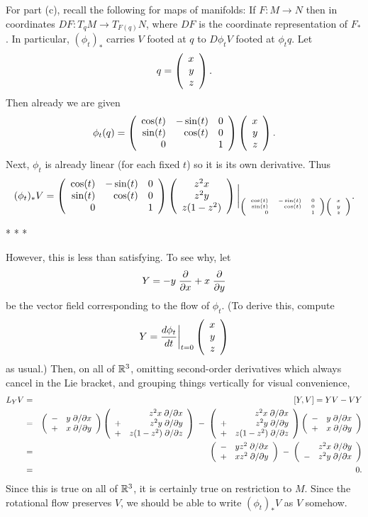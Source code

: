 \documentclass[10pt]{article}
\numberwithin{equation}{subsection}
\begin{document}
For part (c), recall the following for maps of manifolds:  If $F:M \to N$ then
in coordinates $DF:T_qM \to T_{F(q)}N$, where $DF$ is the coordinate
representation of $F_*$.  In particular, $(\phi_t)_*$ carries $V$ footed at $q$
to $D\phi_t V$ footed at $\phi_t q$.
Let
$$
	q=\left(\begin{array}{r} x \\ y \\ z\end{array}\right).
$$
Then already we are given
$$
	\phi_t(q) = \left(\begin{array}{rrrrrrrrrrrr} 
		\cos(t) & -\sin(t) & 0 \\
		\sin(t) &  \cos(t) & 0 \\
		0       &          & 1
	 \end{array}\right)
	\left(\begin{array}{r} x \\ y \\ z\end{array}\right).
$$
Next, $\phi_t$ is already linear (for each fixed $t$) so it is its own
derivative.  Thus
$$
	(\phi_t)_* V =
	\left(\begin{array}{rrrrrrrrrrrr} 
		\cos(t) & -\sin(t) & 0 \\
		\sin(t) &  \cos(t) & 0 \\
		0       &          & 1
	 \end{array}\right)
	\left(\begin{array}{c} z^2 x \\ z^2 y \\ z(1-z^2)
	\end{array}\right)
	\bigg|_{\tiny{
		 \left(\begin{array}{rrrrrrrrrrrr} 
			\cos(t) & -\sin(t) & 0 \\
			\sin(t) &  \cos(t) & 0 \\
			0       &          & 1
		 \end{array}\right) 
		\left(\begin{array}{r} x \\ y \\ z\end{array}\right)
	}}.
$$

\begin{center}* * *\end{center}

However, this is less than satisfying.  To see why, let
$$
	Y = -y\;\frac{\partial}{\partial x} + x\;\frac{\partial}{\partial y}
$$
be the vector field corresponding to the flow of $\phi_t$.
(To derive this, compute
$$
	Y = \frac{d\phi_t}{dt}\bigg|_{\tiny{t=0}}\left(\begin{array}{r} x \\ y \\ z\end{array}\right)
$$
as usual.)  Then, on all of $\mathbb{R}^3$, omitting second-order derivatives which
always cancel in the Lie bracket, and grouping things vertically for visual
convenience,
\begin{eqnarray*}
	L_Y V &=& [Y,V] = YV - VY \\
	&=&
		\left(\begin{array}{rrrrrrrrrrrr} 
			-&y \;\partial/\partial x \\
			+&x \;\partial/\partial y
		 \end{array}\right)
		\left(\begin{array}{rrrrrrrrrrrr} 
			& z^2 x    \;\partial/\partial x \\
			+&z^2 y    \;\partial/\partial y \\
			+&z(1-z^2) \;\partial/\partial z
		 \end{array}\right)
		\;-\;
		\left(\begin{array}{rrrrrrrrrrrr} 
			& z^2 x    \;\partial/\partial x \\
			+&z^2 y    \;\partial/\partial y \\
			+&z(1-z^2) \;\partial/\partial z
		 \end{array}\right)
		\left(\begin{array}{rrrrrrrrrrrr} 
			-&y \;\partial/\partial x \\
			+&x \;\partial/\partial y
		 \end{array}\right) \\
	&=&
		\left(\begin{array}{rrrrrrrrrrrr} 
			-&yz^2 \;\partial/\partial x \\
			+&xz^2 \;\partial/\partial y
		 \end{array}\right)
		\;-\;
		\left(\begin{array}{rrrrrrrrrrrr} 
			& z^2x \;\partial/\partial y \\
			-&z^2y \;\partial/\partial x
		 \end{array}\right) \\
	&=& 0.
\end{eqnarray*}
Since this is true on all of $\mathbb{R}^3$, it is certainly true on restriction to
$M$.  Since the rotational flow preserves $V$, we should be able to write
$(\phi_t)_*V$ as $V$ somehow.
\end{document}
